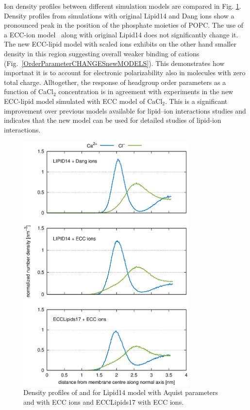 \documentclass[aip,jcp,twocolumn]{revtex4}
\begin{document}
Ion density profiles between different simulation models are compared in Fig. \ref{fig:cacl-dens}.
Density profiles from simulations with original Lipid14 and Dang ions \cite{smith94,chang1999,dang2006} 
show a pronounced peak in the position of the phosphate moieties of POPC. 
The use of a ECC-ion model~\cite{kohagen14,kohagen16} along with original Lipid14 does not significantly change it. 
The new ECC-lipid model with scaled ions exhibits on the other hand smaller density in this region 
suggesting overall weaker binding of cations (Fig.~\ref{OrderParameterCHANGESnewMODELS}). 
This demonstrates how importnat it is to account for electronic polarizability also in molecules with zero total charge. 
Alltogether,
the response of headgroup order parameters as a function of CaCl$_2$ concentration is in agreement with
experiments in the new ECC-lipid model simulated with ECC model of CaCl$_2$. 
This is a significant improvement
over previous models available for lipid--ion interactions studies \cite{catte16} and indicates that
the new model can be used for detailed studies of lipid-ion interactions.

\begin{figure}[]
  \centering
  \includegraphics[width=9.0cm,angle=0]{../Fig/CAdensities.eps}
  \caption{\label{fig:cacl-dens}
    Density profiles of  and  for Lipid14 model with Aquist parameters and with ECC ions and ECCLipids17 with ECC ions. }
\end{figure}
\end{document}
